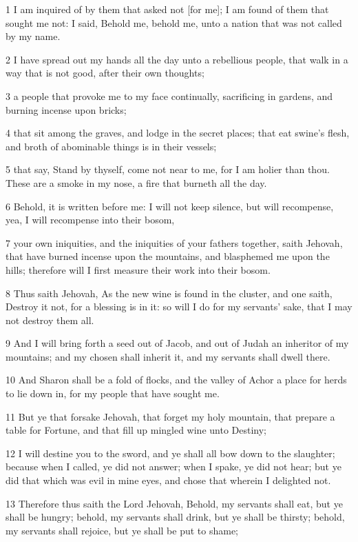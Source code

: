 \par 1 I am inquired of by them that asked not [for me]; I am found of them that sought me not: I said, Behold me, behold me, unto a nation that was not called by my name.
\par 2 I have spread out my hands all the day unto a rebellious people, that walk in a way that is not good, after their own thoughts;
\par 3 a people that provoke me to my face continually, sacrificing in gardens, and burning incense upon bricks;
\par 4 that sit among the graves, and lodge in the secret places; that eat swine's flesh, and broth of abominable things is in their vessels;
\par 5 that say, Stand by thyself, come not near to me, for I am holier than thou. These are a smoke in my nose, a fire that burneth all the day.
\par 6 Behold, it is written before me: I will not keep silence, but will recompense, yea, I will recompense into their bosom,
\par 7 your own iniquities, and the iniquities of your fathers together, saith Jehovah, that have burned incense upon the mountains, and blasphemed me upon the hills; therefore will I first measure their work into their bosom.
\par 8 Thus saith Jehovah, As the new wine is found in the cluster, and one saith, Destroy it not, for a blessing is in it: so will I do for my servants' sake, that I may not destroy them all.
\par 9 And I will bring forth a seed out of Jacob, and out of Judah an inheritor of my mountains; and my chosen shall inherit it, and my servants shall dwell there.
\par 10 And Sharon shall be a fold of flocks, and the valley of Achor a place for herds to lie down in, for my people that have sought me.
\par 11 But ye that forsake Jehovah, that forget my holy mountain, that prepare a table for Fortune, and that fill up mingled wine unto Destiny;
\par 12 I will destine you to the sword, and ye shall all bow down to the slaughter; because when I called, ye did not answer; when I spake, ye did not hear; but ye did that which was evil in mine eyes, and chose that wherein I delighted not.
\par 13 Therefore thus saith the Lord Jehovah, Behold, my servants shall eat, but ye shall be hungry; behold, my servants shall drink, but ye shall be thirsty; behold, my servants shall rejoice, but ye shall be put to shame;
